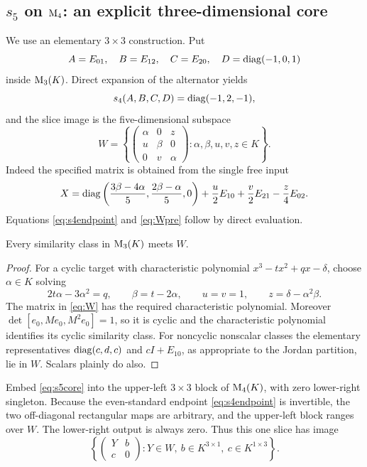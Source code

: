 \subsection{\texorpdfstring{$s_5$ on $\mathrm{M}_4$}{s5 on M4}: an explicit three-dimensional core}
We use an elementary $3\times3$ construction. Put
\begin{equation}\label{eq:s5core}
 A=E_{01},\quad B=E_{12},\quad C=E_{20},\quad
 D=\operatorname{diag}(-1,0,1)
\end{equation}
inside $\mathrm{M}_3(K)$. Direct expansion of the alternator yields
\begin{equation}\label{eq:s4endpoint}
 s_4(A,B,C,D)=\operatorname{diag}(-1,2,-1),
\end{equation}
and the slice image is the five-dimensional subspace
\begin{equation}\label{eq:W}
 W=\left\{
 \begin{pmatrix}\alpha&0&z\\u&\beta&0\\0&v&\alpha\end{pmatrix}
 :\alpha,\beta,u,v,z\in K\right\}.
\end{equation}
Indeed the specified matrix is obtained from the single free input
\begin{equation}\label{eq:Wpre}
 X=\operatorname{diag}\left(\frac{3\beta-4\alpha}{5},
 \frac{2\beta-\alpha}{5},0\right)
 +\frac u2E_{10}+\frac v2E_{21}-\frac z4E_{02}.
\end{equation}
Equations \eqref{eq:s4endpoint} and \eqref{eq:Wpre} follow by
direct evaluation.

\begin{lemma}\label{lem:Wclasses}
Every similarity class in $\mathrm{M}_3(K)$ meets $W$.
\end{lemma}
\begin{proof}
For a cyclic target with characteristic polynomial
$x^3-tx^2+qx-\delta$, choose $\alpha\in K$ solving
\[
 2t\alpha-3\alpha^2=q,
 \qquad \beta=t-2\alpha,
 \qquad u=v=1,\qquad z=\delta-\alpha^2\beta.
\]
The matrix in \eqref{eq:W} has the required characteristic
polynomial. Moreover
$\det[e_0,Me_0,M^2e_0]=1$, so it is cyclic and the
characteristic polynomial identifies its cyclic similarity class.
For noncyclic nonscalar classes the elementary representatives
$\operatorname{diag}(c,d,c)$ and $cI+E_{10}$, as appropriate to the Jordan
partition, lie in $W$. Scalars plainly do also.
\end{proof}

Embed \eqref{eq:s5core} into the upper-left $3\times3$ block of
$\mathrm{M}_4(K)$, with zero lower-right singleton. Because the
even-standard endpoint \eqref{eq:s4endpoint} is invertible, the
two off-diagonal rectangular maps are arbitrary, and the
upper-left block ranges over $W$. The lower-right output is
always zero. Thus this one slice has image
\begin{equation}\label{eq:3plus1}
 \left\{\begin{pmatrix}Y&b\\c&0\end{pmatrix}:
 Y\in W,\ b\in K^{3\times1},\ c\in K^{1\times3}\right\}.
\end{equation}

